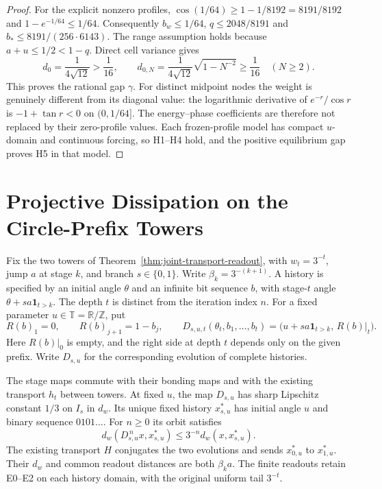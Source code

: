 \begin{proof}
For the explicit nonzero profiles, $\cos(1/64)\geq1-1/8192=8191/8192$ and
$1-e^{-1/64}\leq1/64$. Consequently $b_w\leq1/64$,
$q\leq2048/8191$ and $b_*\leq8191/(256\cdot6143)$.
The range assumption holds because $a+u\leq1/2<1-q$.
Direct cell variance gives
\[
 d_0=\frac1{4\sqrt{12}}>\frac1{16},\qquad
 d_{0,N}=\frac1{4\sqrt{12}}\sqrt{1-N^{-2}}\geq\frac1{16}\quad(N\geq2).
\]
This proves the rational gap $\gamma$. For distinct midpoint nodes the
weight is genuinely different from its diagonal value: the logarithmic
derivative of $e^{-r}/\cos r$ is $-1+\tan r<0$ on $(0,1/64]$.
The energy--phase coefficients are therefore not replaced by their zero-profile
values. Each frozen-profile model has compact $u$-domain and continuous forcing,
so H1--H4 hold, and the positive equilibrium gap proves H5 in that model.
\end{proof}

\section{Projective Dissipation on the Circle-Prefix Towers}

Fix the two towers of Theorem~\ref{thm:joint-transport-readout}, with $w_t=3^{-t}$, jump $a$ at stage $k$, and branch $s\in\{0,1\}$. Write $\beta_k=3^{-(k+1)}$. A history is specified by an initial angle $\theta$ and an infinite bit sequence $b$, with stage-$t$ angle $\theta+sa\mathbf{1}_{t>k}$. The depth $t$ is distinct from the iteration index $n$. For a fixed parameter $u\in\mathbb T=\mathbb R/\mathbb Z$, put
\[
 R(b)_1=0,\qquad R(b)_{j+1}=1-b_j,\qquad
 D_{s,u,t}(\theta_t,b_1,\ldots,b_t)
 =\bigl(u+sa\mathbf{1}_{t>k},\,R(b)|_t\bigr).
\]
Here $R(b)|_0$ is empty, and the right side at depth $t$ depends only on the given prefix. Write $D_{s,u}$ for the corresponding evolution of complete histories.

\begin{theorem}\label{thm:projective-dissipation}
The stage maps commute with their bonding maps and with the existing transport $h_t$ between towers. At fixed $u$, the map $D_{s,u}$ has sharp Lipschitz constant $1/3$ on $I_s$ in $d_w$. Its unique fixed history $x^\ast_{s,u}$ has initial angle $u$ and binary sequence $0101\ldots$. For $n\geq 0$ its orbit satisfies
\[
 d_w(D_{s,u}^{\,n}x,x^\ast_{s,u})\leq 3^{-n}d_w(x,x^\ast_{s,u}).
\]
The existing transport $H$ conjugates the two evolutions and sends $x^\ast_{0,u}$ to $x^\ast_{1,u}$. Their $d_w$ and common readout distances are both $\beta_k a$. The finite readouts retain E0--E2 on each history domain, with the original uniform tail $3^{-t}$.
\end{theorem}

